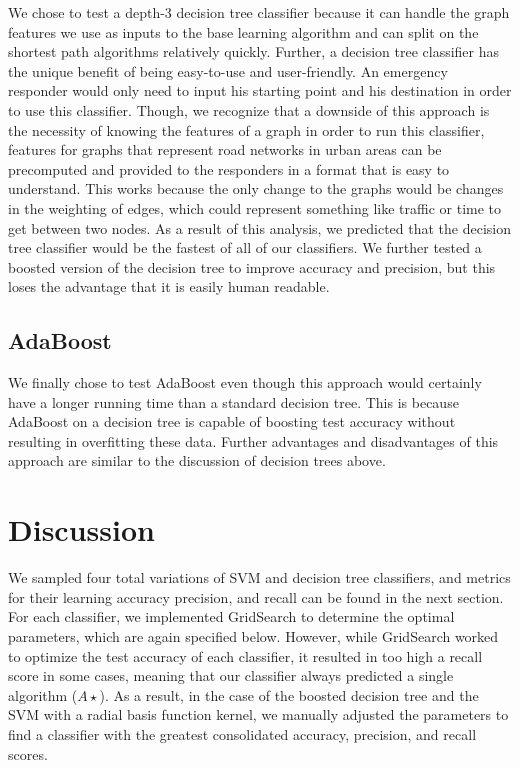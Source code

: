 \documentclass{article}
\begin{document}
We chose to test a depth-3 decision tree classifier because it can handle the graph features we use as inputs to the base learning algorithm and can split on the shortest path algorithms relatively quickly. Further, a decision tree classifier has the unique benefit of being easy-to-use and user-friendly. An emergency responder would only need to input his starting point and his destination in order to use this classifier. Though, we recognize that a downside of this approach is the necessity of knowing the features of a graph in order to run this classifier, features for graphs that represent road networks in urban areas can be precomputed and provided to the responders in a format that is easy to understand. This works because the only change to the graphs would be changes in the weighting of edges, which could represent something like traffic or time to get between two nodes. As a result of this analysis, we predicted that the decision tree classifier would be the fastest of all of our classifiers. We further tested a boosted version of the decision tree to improve accuracy and precision, but this loses the advantage that it is easily human readable.

\subsection{AdaBoost}

We finally chose to test AdaBoost even though this approach would certainly have a longer running time than a standard decision tree. This is because AdaBoost on a decision tree is capable of boosting test accuracy without resulting in overfitting these data. Further advantages and disadvantages of this approach are similar to the discussion of decision trees above.

\section{Discussion}

We sampled four total variations of SVM and decision tree classifiers, and metrics for their learning accuracy precision, and recall can be found in the next section. For each classifier, we implemented GridSearch to determine the optimal parameters, which are again specified below. However, while GridSearch worked to optimize the test accuracy of each classifier, it resulted in too high a recall score in some cases, meaning that our classifier always predicted a single algorithm ($A\star$). As a result, in the case of the boosted decision tree and the SVM with a radial basis function kernel, we manually adjusted the parameters to find a classifier with the greatest consolidated accuracy, precision, and recall scores.
\end{document}
